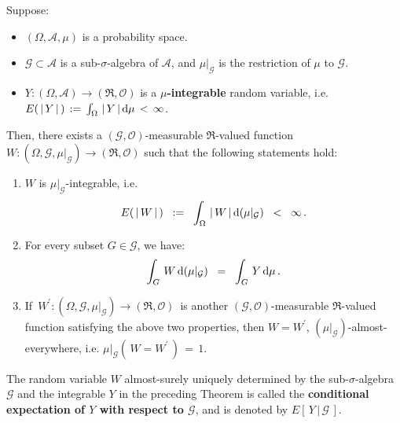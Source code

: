 \begin{theorem}
\label{Thm:ExistenceConditionalExpectation}
\mbox{}\vskip 0.2cm
\noindent
Suppose:
\begin{itemize}
\item
	$(\Omega,\mathcal{A},\mu)$ is a probability space.
\item
	$\mathcal{G} \subset \mathcal{A}$ is a sub-$\sigma$-algebra of $\mathcal{A}$,
	and $\mu\vert_{\mathcal{G}}$ is the restriction of $\mu$ to $\mathcal{G}$.
\item
	$Y : (\Omega,\mathcal{A}) \longrightarrow (\Re,\mathcal{O})$ is a \textbf{\color{red}$\mu$-integrable} random variable,
	i.e. $E\!\left(\,\vert\,Y\,\vert\,\right) \,:=\, \int_{\Omega}\, \vert\, Y\,\vert \,\textnormal{d}\mu \,<\, \infty$.
\end{itemize}
Then, there exists a $(\mathcal{G},\mathcal{O})$-measurable $\Re$-valued function
$W : (\Omega,\mathcal{G},\mu\vert_{\mathcal{G}}) \longrightarrow (\Re,\mathcal{O})$
such that the following statements hold:
\begin{enumerate}
\item
	$W$ is $\mu\vert_{\mathcal{G}}$-integrable, i.e.
	\begin{equation*}
	E\!\left(\,\vert\,W\,\vert\,\right)
	\;\; := \;\;
	\int_{\Omega}\,\vert\,W\,\vert\,\textnormal{d}(\mu\vert_{\mathcal{G}})
	\;\; < \;\;
	\infty\,.
	\end{equation*}
\item
	For every subset $G \in \mathcal{G}$, we have:
	\begin{equation*}
	\int_{G}\, W \,\textnormal{d}(\mu\vert_{\mathcal{G}})
	\;\; = \;\;
	\int_{G}\, Y \,\textnormal{d}\mu\,.
	\end{equation*}
\item
	If \,$W^{\prime} : (\Omega,\mathcal{G},\mu\vert_{\mathcal{G}}) \longrightarrow (\Re,\mathcal{O})$\, is
	another $(\mathcal{G},\mathcal{O})$-measurable $\Re$-valued function
	satisfying the above two properties, then
	$W = W^{\prime}$, $(\mu\vert_{\mathcal{G}})$-almost-everywhere,
	i.e. $\mu\vert_{\mathcal{G}}\!\left(\,W = W^{\prime}\,\right) \,=\, 1$. 
\end{enumerate}
\end{theorem}

\begin{remark}\mbox{}\vskip 0.1cm\noindent
The random variable $W$ almost-surely uniquely determined
by the sub-$\sigma$-algebra $\mathcal{G}$ and the integrable $Y$
in the preceding Theorem is called the
\textbf{conditional expectation of $Y$ with respect to $\mathcal{G}$}, and is denoted
by $E\!\left[\,Y\,\vert\,\mathcal{G}\,\right]$.
\end{remark}

